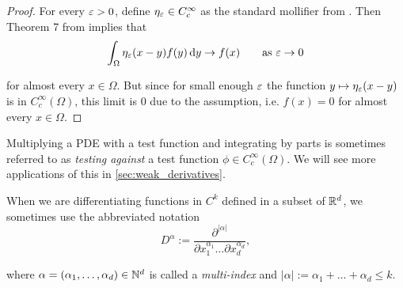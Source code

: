 \begin{proof}
    For every $\varepsilon > 0$, define $\eta_\varepsilon \in C_c^\infty$ as the standard mollifier from \cite[Appendix C.5]{evans2010partial}. Then Theorem 7 from \cite[Appendix C.5]{evans2010partial} implies that
%
    \begin{equation*}
        \int_\Omega \eta_\varepsilon(x - y) f(y) \mathop{}\!\mathrm{d} y \to f(x) \qquad \text{as } \varepsilon \to 0
    \end{equation*}

    \noindent
    for almost every $x \in \Omega$. But since for small enough $\varepsilon$ the function $y \mapsto \eta_\varepsilon(x - y)$ is in $C_c^\infty(\Omega)$, this limit is $0$ due to the assumption, i.e. $f(x) = 0$ for almost every $x \in \Omega$.
\end{proof}

Multiplying a PDE with a test function and integrating by parts is sometimes referred to as \emph{testing against} a test function $\phi \in C^\infty_c(\Omega)$. We will see more applications of this in \cref{sec:weak_derivatives}.

When we are differentiating functions in $C^k$ defined in a subset of $\mathbb{R}^d$, we sometimes use the abbreviated notation
%
\begin{equation*}
    D^\alpha := \frac{\partial^{|\alpha|}}{\partial x_1^{\alpha_1} \dots \partial x_d^{\alpha_d}} ,
\end{equation*}

\noindent
where $\alpha = (\alpha_1, \dots, \alpha_d) \in \mathbb{N}^d$ is called a \emph{multi-index} and $|\alpha| := \alpha_1 + \dots + \alpha_d \leq k$.